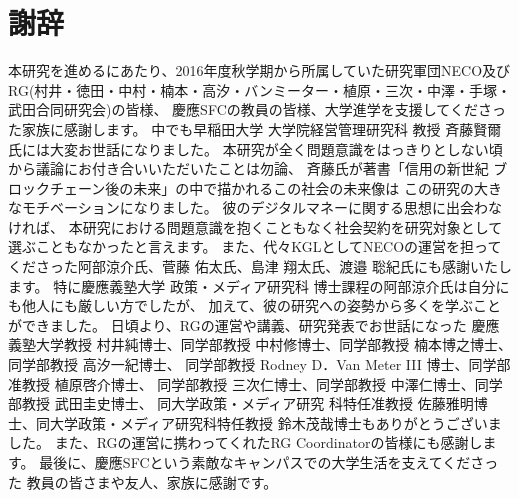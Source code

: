 \chapter*{謝辞}
本研究を進めるにあたり、2016年度秋学期から所属していた研究軍団NECO及び
RG(村井・徳田・中村・楠本・高汐・バンミーター・植原・三次・中澤・手塚・武田合同研究会)の皆様、
慶應SFCの教員の皆様、大学進学を支援してくださった家族に感謝します。
中でも早稲田大学 大学院経営管理研究科 教授 斉藤賢爾氏には大変お世話になりました。
本研究が全く問題意識をはっきりとしない頃から議論にお付き合いいただいたことは勿論、
斉藤氏が著書「信用の新世紀 ブロックチェーン後の未来」\cite{saito2017}の中で描かれるこの社会の未来像は
この研究の大きなモチベーションになりました。
彼のデジタルマネーに関する思想に出会わなければ、
本研究における問題意識を抱くこともなく社会契約を研究対象として選ぶこともなかったと言えます。
また、代々KGLとしてNECOの運営を担ってくださった阿部涼介氏、菅藤 佑太氏、島津 翔太氏、渡邉 聡紀氏にも感謝いたします。
特に慶應義塾大学 政策・メディア研究科 博士課程の阿部涼介氏は自分にも他人にも厳しい方でしたが、
加えて、彼の研究への姿勢から多くを学ぶことができました。
日頃より、RGの運営や講義、研究発表でお世話になった
慶應義塾大学教授 村井純博士、同学部教授 中村修博士、同学部教授 楠本博之博士、同学部教授 高汐一紀博士、
同学部教授 Rodney D．Van Meter III 博士、同学部准教授 植原啓介博士、
同学部教授 三次仁博士、同学部教授 中澤仁博士、同学部教授 武田圭史博士、
同大学政策・メディア研究 科特任准教授 佐藤雅明博士、同大学政策・メディア研究科特任教授 鈴木茂哉博士もありがとうございました。
また、RGの運営に携わってくれたRG Coordinatorの皆様にも感謝します。
最後に、慶應SFCという素敵なキャンパスでの大学生活を支えてくださった
教員の皆さまや友人、家族に感謝です。
